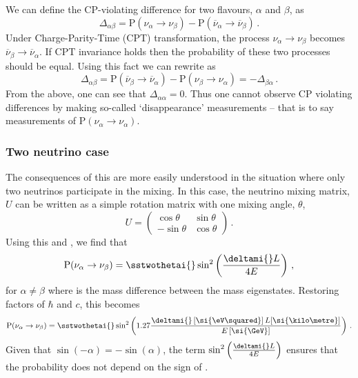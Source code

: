 We can define the CP-violating difference for two flavours, $\alpha$ and $\beta$, as
\begin{equation}
  \Delta_{\alpha \beta} = \text{P}(\nu_{\alpha} \rightarrow \nu_{\beta}) - \text{P}(\overline{\nu}_{\alpha} \rightarrow \overline{\nu}_{\beta}) \, .
  \label{eq:cpViolation}
\end{equation}
Under Charge-Parity-Time (CPT) transformation, the process $\nu_{\alpha} \rightarrow \nu_{\beta}$ becomes $\overline{\nu}_{\beta} \rightarrow \overline{\nu}_{\alpha}$.
If CPT invariance holds then the probability of these two processes should be equal.
Using this fact we can rewrite  as
\begin{equation}
  \Delta_{\alpha \beta} = \text{P}(\overline{\nu}_{\beta} \rightarrow \overline{\nu}_{\alpha}) - \text{P}(\nu_{\beta} \rightarrow \nu_{\alpha}) = -\Delta_{\beta \alpha} \, .
\end{equation}
From the above, one can see that $\Delta_{\alpha \alpha} = 0$.
Thus one cannot observe CP violating differences by making so-called `disappearance' measurements -- that is to say measurements of $\text{P}(\nu_{\alpha} \rightarrow \nu_{\alpha})$.
  
\subsubsection{Two neutrino case}
\label{sec:theory:theory:twoNeutrino}

The consequences of this are more easily understood in the situation where only two neutrinos participate in the mixing.
In this case, the neutrino mixing matrix, $U$ can be written as a simple rotation matrix with one mixing angle, $\theta$,
\begin{equation}
  U =
  \begin{pmatrix}
    \cos\theta  & \sin\theta \\
    -\sin\theta & \cos\theta
  \end{pmatrix} \, .
\end{equation}
Using this and , we find that
\begin{equation}
  \text{P}(\nu_{\alpha}\rightarrow\nu_{\beta}) = \sstwothetai{} \sin^{2} \left(\frac{\deltami{} L}{4E} \right) \, ,
\end{equation}
for $\alpha \neq \beta$ where \deltami{} is the mass difference between the mass eigenstates.
Restoring factors of $\hbar$ and $c$, this becomes
\begin{equation}
  \text{P}(\nu_{\alpha}\rightarrow\nu_{\beta}) = \sstwothetai{} \sin^{2} \left( 1.27 \frac{\deltami{} \left[\si{\eV\squared}\right] L [\si{\kilo\metre}]}{E\left[\si{\GeV}\right]} \right) \, .
  \label{eq:twoNuProb}
\end{equation}
Given that $\sin(-\alpha) = -\sin(\alpha)$, the term $\sin^{2} \left(\frac{\deltami{} L}{4E} \right)$ ensures that the probability does not depend on the sign of \deltami{}.

